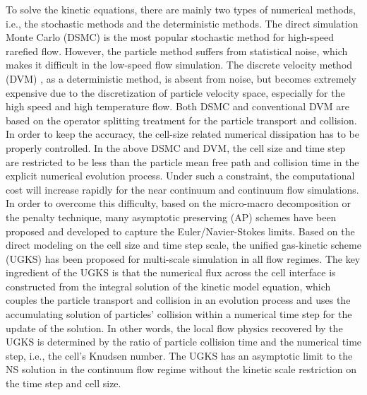 \documentclass[3p,12pt]{elsarticle}
\begin{document}
	
	To solve the kinetic equations, there are mainly two types of numerical methods, i.e., the stochastic methods and the deterministic methods.
	The direct simulation Monte Carlo (DSMC) \cite{bird1994molecular} is the most popular stochastic method for high-speed rarefied flow.
	However, the particle method suffers from statistical noise, which makes it difficult in the low-speed flow simulation.
	The discrete velocity method (DVM) \cite{mieussens2000discrete}, as a deterministic method, is absent from noise, but becomes
	extremely expensive due to the discretization of particle velocity space, especially for the high speed and high temperature flow.
	Both DSMC and conventional DVM are based on the operator splitting treatment for the particle transport and collision.
	In order to keep the accuracy, the cell-size related numerical dissipation has to be properly controlled.
	In the above DSMC and DVM,  the cell size and time step are restricted to be less than the particle mean free path and collision time in the explicit numerical evolution process. 	Under such a constraint, the computational cost will increase rapidly for the near continuum and continuum flow simulations.
	In order to overcome this difficulty, based on the micro-macro decomposition or the penalty technique, many asymptotic preserving (AP) \cite{jin1999efficient} schemes have been proposed and developed to capture the Euler/Navier-Stokes limits.
	Based on the direct modeling on the cell size and time step scale, the unified gas-kinetic scheme (UGKS) \cite{xu2010unified, huang2012,liu2014unified,liu2016,liu2017} has been proposed for multi-scale simulation in all flow regimes. The key ingredient of the UGKS is that the numerical flux across the cell interface is constructed from the integral solution of the kinetic model equation, which couples the particle transport and collision in an evolution process and uses the accumulating solution of particles' collision within a numerical time step for the update of the solution. In other words, the local flow physics recovered by the UGKS is determined by the ratio of particle collision time and the numerical time step, i.e., the cell's Knudsen number.
	The UGKS has an asymptotic limit to the NS solution in the continuum flow regime without the kinetic scale restriction on the time step and cell size.
	
\end{document}
